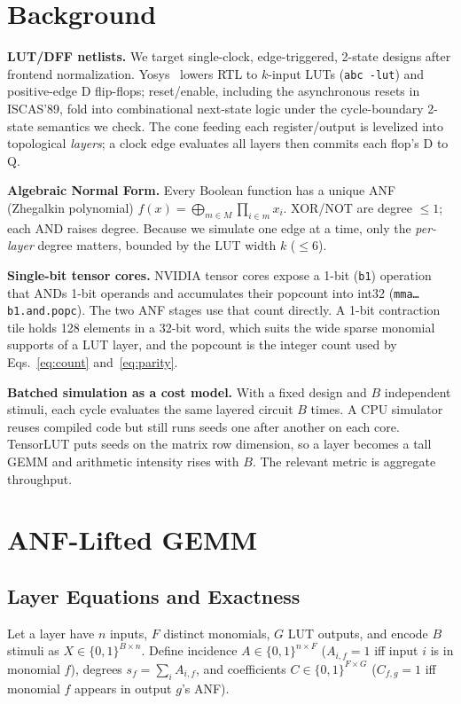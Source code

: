 \documentclass[sigconf]{acmart}
\newcommand{\mmapopc}{\texttt{and.popc}}
\begin{document}
\section{Background}
\textbf{LUT/DFF netlists.} We target single-clock, edge-triggered, 2-state designs after frontend
normalization. Yosys~\cite{yosys} lowers RTL to $k$-input LUTs (\texttt{abc -lut}) and positive-edge D
flip-flops; reset/enable, including the asynchronous resets in ISCAS'89, fold into combinational
next-state logic under the cycle-boundary 2-state semantics we check.
The cone feeding each register/output is levelized into topological \emph{layers}; a clock edge
evaluates all layers then commits each flop's D to Q.

\textbf{Algebraic Normal Form.} Every Boolean function has a unique ANF (Zhegalkin polynomial)
$f(x)=\bigoplus_{m\in M}\prod_{i\in m} x_i$. XOR/NOT are degree $\le 1$; each AND raises degree.
Because we simulate one edge at a time, only the \emph{per-layer} degree matters, bounded by the
LUT width $k$ ($\le 6$).

\textbf{Single-bit tensor cores.} NVIDIA tensor cores expose a 1-bit (\texttt{b1}) operation that
ANDs 1-bit operands and accumulates their popcount into int32 (\texttt{mma\dots b1.\mmapopc}). The
two ANF stages use that count directly. A 1-bit contraction tile holds 128 elements in a 32-bit
word, which suits the wide sparse monomial supports of a LUT layer, and the popcount is the integer
count used by Eqs.~\eqref{eq:count} and~\eqref{eq:parity}.

\textbf{Batched simulation as a cost model.} With a fixed design and $B$ independent stimuli, each
cycle evaluates the same layered circuit $B$ times. A CPU simulator reuses compiled code but still
runs seeds one after another on each core. TensorLUT puts seeds on the matrix row dimension, so a
layer becomes a tall GEMM and arithmetic intensity rises with $B$. The relevant metric is
aggregate throughput.

\section{ANF-Lifted GEMM}\label{sec:form}
\subsection{Layer Equations and Exactness}
Let a layer have $n$ inputs, $F$ distinct monomials, $G$ LUT outputs, and encode $B$ stimuli as
$X\in\{0,1\}^{B\times n}$. Define incidence $A\in\{0,1\}^{n\times F}$ ($A_{i,f}=1$ iff input $i$
is in monomial $f$), degrees $s_f=\sum_i A_{i,f}$, and coefficients $C\in\{0,1\}^{F\times G}$
($C_{f,g}=1$ iff monomial $f$ appears in output $g$'s ANF).
\end{document}
